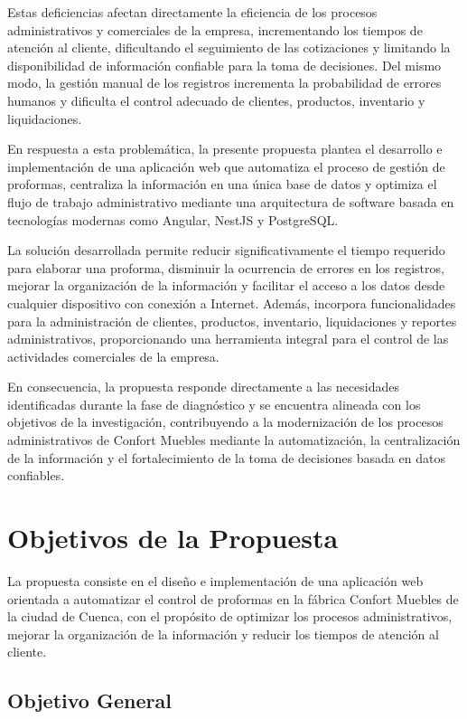 Estas deficiencias afectan directamente la eficiencia de los procesos administrativos y comerciales de la empresa, incrementando los tiempos de atención al cliente, dificultando el seguimiento de las cotizaciones y limitando la disponibilidad de información confiable para la toma de decisiones. Del mismo modo, la gestión manual de los registros incrementa la probabilidad de errores humanos y dificulta el control adecuado de clientes, productos, inventario y liquidaciones.

En respuesta a esta problemática, la presente propuesta plantea el desarrollo e implementación de una aplicación web que automatiza el proceso de gestión de proformas, centraliza la información en una única base de datos y optimiza el flujo de trabajo administrativo mediante una arquitectura de software basada en tecnologías modernas como Angular, NestJS y PostgreSQL.

La solución desarrollada permite reducir significativamente el tiempo requerido para elaborar una proforma, disminuir la ocurrencia de errores en los registros, mejorar la organización de la información y facilitar el acceso a los datos desde cualquier dispositivo con conexión a Internet. Además, incorpora funcionalidades para la administración de clientes, productos, inventario, liquidaciones y reportes administrativos, proporcionando una herramienta integral para el control de las actividades comerciales de la empresa.

En consecuencia, la propuesta responde directamente a las necesidades identificadas durante la fase de diagnóstico y se encuentra alineada con los objetivos de la investigación, contribuyendo a la modernización de los procesos administrativos de Confort Muebles mediante la automatización, la centralización de la información y el fortalecimiento de la toma de decisiones basada en datos confiables.
\section{Objetivos de la Propuesta}

La propuesta consiste en el diseño e implementación de una aplicación web orientada a automatizar el control de proformas en la fábrica Confort Muebles de la ciudad de Cuenca, con el propósito de optimizar los procesos administrativos, mejorar la organización de la información y reducir los tiempos de atención al cliente.

\subsection{Objetivo General}

